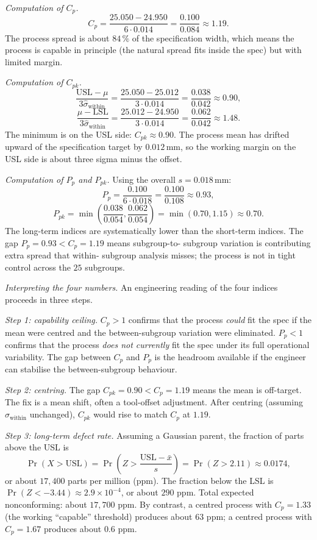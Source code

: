 \textit{Computation of $C_{p}$.}
\[
C_{p} = \frac{25.050 - 24.950}{6 \cdot 0.014}
= \frac{0.100}{0.084}
\approx 1.19.
\]
The process spread is about $84 \,\%$ of the specification width,
which means the process is capable in principle (the natural spread
fits inside the spec) but with limited margin.

\textit{Computation of $C_{pk}$.}
\[
\frac{\text{USL} - \mu}{3 \hat{\sigma}_{\text{within}}}
= \frac{25.050 - 25.012}{3 \cdot 0.014}
= \frac{0.038}{0.042} \approx 0.90,
\]
\[
\frac{\mu - \text{LSL}}{3 \hat{\sigma}_{\text{within}}}
= \frac{25.012 - 24.950}{3 \cdot 0.014}
= \frac{0.062}{0.042} \approx 1.48.
\]
The minimum is on the USL side: $C_{pk} \approx 0.90$. The process
mean has drifted upward of the specification target by $0.012
\,\si{\milli\meter}$, so the working margin on the USL side is
about three sigma minus the offset.

\textit{Computation of $P_{p}$ and $P_{pk}$.} Using the overall
$s = 0.018 \,\si{\milli\meter}$:
\[
P_{p} = \frac{0.100}{6 \cdot 0.018}
= \frac{0.100}{0.108}
\approx 0.93,
\]
\[
P_{pk} = \min\!\left(\frac{0.038}{0.054},
\frac{0.062}{0.054}\right)
= \min(0.70, 1.15)
\approx 0.70.
\]
The long-term indices are systematically lower than the short-term
indices. The gap $P_{p} = 0.93 < C_{p} = 1.19$ means subgroup-to-
subgroup variation is contributing extra spread that within-
subgroup analysis misses; the process is not in tight control
across the $25$ subgroups.

\textit{Interpreting the four numbers.} An engineering reading of
the four indices proceeds in three steps.

\textit{Step 1: capability ceiling.} $C_{p} > 1$ confirms that the
process \emph{could} fit the spec if the mean were centred and the
between-subgroup variation were eliminated. $P_{p} < 1$ confirms
that the process \emph{does not currently} fit the spec under
its full operational variability. The gap between $C_{p}$ and
$P_{p}$ is the headroom available if the engineer can stabilise
the between-subgroup behaviour.

\textit{Step 2: centring.} The gap $C_{pk} = 0.90 < C_{p} = 1.19$
means the mean is off-target. The fix is a mean shift, often a
tool-offset adjustment. After centring (assuming
$\hat{\sigma}_{\text{within}}$ unchanged), $C_{pk}$ would rise to
match $C_{p}$ at $1.19$.

\textit{Step 3: long-term defect rate.} Assuming a Gaussian parent,
the fraction of parts above the USL is
\[
\Pr(X > \text{USL}) = \Pr\!\left(Z > \frac{\text{USL} - \bar{x}}
{s}\right)
= \Pr(Z > 2.11)
\approx 0.0174,
\]
or about $17{,}400$ parts per million (ppm). The fraction below
the LSL is $\Pr(Z < -3.44) \approx 2.9 \times 10^{-4}$, or about
$290$ ppm. Total expected nonconforming: about $17{,}700$ ppm.
By contrast, a centred process with $C_{p} = 1.33$ (the working
``capable'' threshold) produces about $63$ ppm; a centred process
with $C_{p} = 1.67$ produces about $0.6$ ppm.

